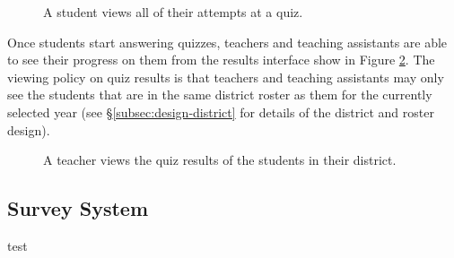 \begin{figure}[h!]
	\centering
	\caption{A student views all of their attempts at a quiz.}
	\label{fig:screens-quiz-attempt-list}
\end{figure}

Once students start answering quizzes, teachers and teaching assistants are able to see their progress on them from the results interface show in Figure \ref{fig:screens-quiz-results-list}. The viewing policy on quiz results is that teachers and teaching assistants may only see the students that are in the same district roster as them for the currently selected year (see \S \ref{subsec:design-district} for details of the district and roster design).

\begin{figure}[h!]
	\centering
	\caption{A teacher views the quiz results of the students in their district.}
	\label{fig:screens-quiz-results-list}
\end{figure}

\subsection{Survey System}
\label{subsec:design-survey}
test

